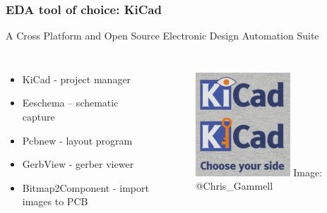 \documentclass[t]{beamer}
\begin{document}
\begin{frame}[t]
\frametitle{EDA tool of choice: KiCad}

A Cross Platform and Open Source Electronic Design Automation Suite

\begin{columns}
	\begin{itemize}
		\item KiCad - project manager
		\item Eeschema – schematic capture
		\item Pcbnew - layout program
		\item GerbView - gerber viewer
		\item Bitmap2Component - import images to PCB
	\end{itemize}
	
	
	\begin{figure}
		\includegraphics[width=1\linewidth]{kikeycad.png}
		Image: @Chris\_Gammell
	\end{figure}
	
\end{columns}
\end{frame}
\end{document}
